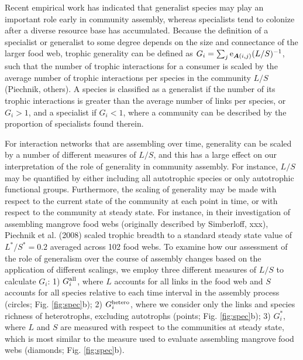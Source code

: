 \documentclass[9pt,twocolumn,twoside]{pnas-new}
\newcommand{\rr}[1]{{\rm #1}}
\begin{document}
Recent empirical work has indicated that generalist species may play an important role early in community assembly, whereas specialists tend to colonize after a diverse resource base has accumulated.
Because the definition of a specialist or generalist to some degree depends on the size and connectance of the larger food web, trophic generality can be defined as $G_i = \sum_j \rr{e}_{{\bm A}(i,j)}(L/S)^{-1}$, such that the number of trophic interactions for a consumer is scaled by the average number of trophic interactions per species in the community $L/S$ (Piechnik, others).
A species is classified as a generalist if the number of its trophic interactions is greater than the average number of links per species, or $G_i > 1$, and a specialist if $G_i < 1$, where a community can be described by the proportion of specialists found therein. %

For interaction networks that are assembling over time, generality can be scaled by a number of different measures of $L/S$, and this has a large effect on our interpretation of the role of generality in community assembly.
For instance, $L/S$ may be quantified by either including all autotrophic species or only autotrophic functional groups.
Furthermore, the scaling of generality may be made with respect to the current state of the community at each point in time, or with respect to the community at steady state.
For instance, in their investigation of assembling mangrove food webs (originally described by Simberloff, xxx), Piechnik et al. (2008) scaled trophic breadth to a standard steady state value of $L^*/S^* = 0.2$ averaged across 102 food webs.
To examine how our assessment of the role of generalism over the course of assembly changes based on the application of different scalings, we employ three different measures of $L/S$ to calculate $G_i$:
1) $G_i^{\rr{all}}$, where $L$ accounts for all links in the food web and $S$ accounts for all species relative to each time interval in the assembly process (circles; Fig. \ref{fig:spec}b);
2) $G_i^{\rr{hetero}}$, where we consider only the links and species richness of heterotrophs, excluding autotrophs (points; Fig. \ref{fig:spec}b);
3) $G_i^*$, where $L$ and $S$ are measured with respect to the communities at steady state, which is most similar to the measure used to evaluate assembling mangrove food webs (diamonds; Fig. \ref{fig:spec}b).
\end{document}
